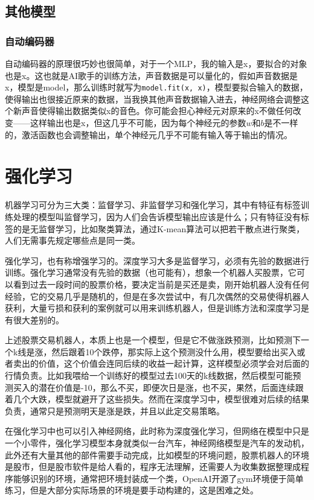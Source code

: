 \documentclass[a5paper, 11pt]{ctexbook}
\begin{document}
\subsection{其他模型}
\subsubsection{自动编码器}
自动编码器的原理很巧妙也很简单，对于一个MLP，我的输入是x，要拟合的对象也是x。这也就是AI歌手的训练方法，声音数据是可以量化的，假如声音数据是x，模型是model，那么训练时就写为\verb|model.fit(x, x)|，模型要拟合输入的数据，使得输出也很接近原来的数据，当我换其他声音数据输入进去，神经网络会调整这个新声音使得输出数据类似x的音色。你可能会担心神经元对原来的x不做任何改变——这样输出也是x，但这几乎不可能，因为每个神经元的参数$w$和$b$是不一样的，激活函数也会调整输出，单个神经元几乎不可能有输入等于输出的情况。

\section{强化学习}

机器学习可分为三大类：监督学习、非监督学习和强化学习，其中有特征有标签训练处理的模型叫监督学习，因为人们会告诉模型输出应该是什么；只有特征没有标签的是无监督学习，比如聚类算法，通过K-mean算法可以把若干散点进行聚类，人们无需事先规定哪些点是同一类。

强化学习，也有称增强学习的。深度学习大多是监督学习，必须有先验的数据进行训练。强化学习通常没有先验的数据（也可能有），想象一个机器人买股票，它可以看到过去一段时间的股票价格，要决定当前是买还是卖，刚开始机器人没有任何经验，它的交易几乎是随机的，但是在多次尝试中，有几次偶然的交易使得机器人获利，大量亏损和获利的案例就可以用来训练机器人，但是训练方法和深度学习是有很大差别的。

上述股票交易机器人，本质上也是一个模型，但是它不做涨跌预测，比如预测下一个k线是涨，然后跟着10个跌停，那实际上这个预测没什么用，模型要给出买入或者卖出的价值，这个价值会连同后续的收益一起计算，这样模型必须学会对后面的行情负责。比如我喂给一个训练好的模型过去100天的k线数据，然后模型可能预测买入的潜在价值是-10，那么不买，即便次日是涨，也不买，果然，后面连续跟着几个大跌，模型就避开了这些损失。然而在深度学习中，模型很难对后续的结果负责，通常只是预测明天是涨是跌，并且以此定交易策略。

在强化学习中也可以引入神经网络，此时称为深度强化学习，但网络在模型中只是一个小零件，强化学习模型本身就类似一台汽车，神经网络模型是汽车的发动机，此外还有大量其他的部件需要手动完成，比如模型的环境问题，股票机器人的环境是股市，但是股市软件是给人看的，程序无法理解，还需要人为收集数据整理成程序能够识别的环境，通常把环境封装成一个类，OpenAI开源了gym环境便于简单练习，但是大部分实际场景的环境是要手动构建的，这是困难之处。
\end{document}
